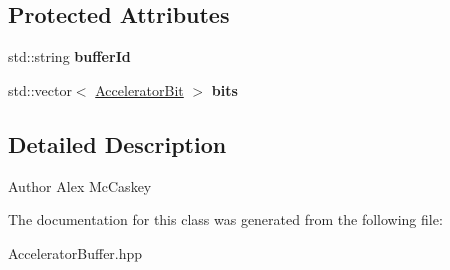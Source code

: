\subsection*{Protected Attributes}
\begin{DoxyCompactItemize}
\item 
std\+::string {\bfseries buffer\+Id}\hypertarget{a00013_adca17dc5025c067a927aefd6a5cbe51b}{}\label{a00013_adca17dc5025c067a927aefd6a5cbe51b}

\item 
std\+::vector$<$ \hyperlink{a00012}{Accelerator\+Bit} $>$ {\bfseries bits}\hypertarget{a00013_a36b3300cbada4e54e9e68d1c7c135c9b}{}\label{a00013_a36b3300cbada4e54e9e68d1c7c135c9b}

\end{DoxyCompactItemize}


\subsection{Detailed Description}
\begin{DoxyAuthor}{Author}
Alex Mc\+Caskey 
\end{DoxyAuthor}


The documentation for this class was generated from the following file\+:\begin{DoxyCompactItemize}
\item 
Accelerator\+Buffer.\+hpp\end{DoxyCompactItemize}
